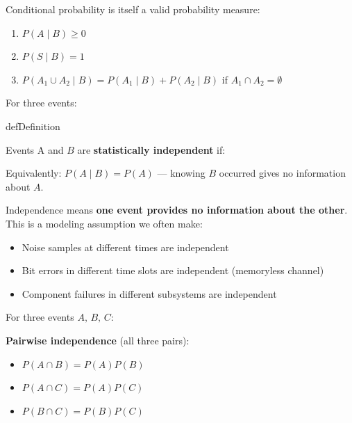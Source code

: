 
Conditional probability is itself a valid probability measure:

\begin{enumerate}
\def\labelenumi{\arabic{enumi}.}
\tightlist
\item
  $P(A \mid B) \ge 0$
\item
  $P(S \mid B) = 1$
\item
  $P(A_{1} \cup A_{2} \mid B) = P(A_{1} \mid B) + P(A_{2} \mid B)$ if $A_{1} \cap A_{2} = \emptyset$
\end{enumerate}



For three events:


\begin{PSbox}[unbreakable]{def}{Definition}

Events A and $B$ are \textbf{statistically independent} if:


Equivalently: $P(A \mid B) = P(A)$ — knowing $B$ occurred gives no information about $A$.

\end{PSbox}


Independence means \textbf{one event provides no information about the other}. This is a modeling assumption we often make:

\begin{itemize}
\tightlist
\item
  Noise samples at different times are independent
\item
  Bit errors in different time slots are independent (memoryless channel)
\item
  Component failures in different subsystems are independent
\end{itemize}


For three events $A,\, B,\, C$:

\textbf{Pairwise independence} (all three pairs):

\begin{itemize}
\tightlist
\item
  $P(A \cap B) = P(A)P(B)$
\item
  $P(A \cap C) = P(A)P(C)$
\item
  $P(B \cap C) = P(B)P(C)$
\end{itemize}

